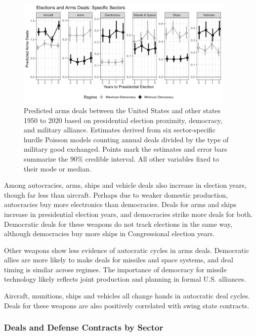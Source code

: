 \documentclass[12pt]{article}
\begin{document}
\begin{figure}[htpb]
	\centering
		\includegraphics[width=0.95\textwidth]{../figures/deals-sector.png}
	\caption{Predicted arms deals between the United States and other states 1950 to 2020 based on presidential election proximity, democracy, and military alliance. Estimates derived from six sector-specific hurdle Poisson models counting annual deals divided by the type of military good exchanged. Points mark the estimates and error bars summarize the 90\% credible interval. All other variables fixed to their mode or median.}
	\label{fig:deals-sector}
\end{figure}


Among autocracies, arms, ships and vehicle deals also increase in election years, though far less than aircraft. 
Perhaps due to weaker domestic production, autocracies buy more electronics than democracies. 
Deals for arms and ships increase in presidential election years, and democracies strike more deals for both.  
Democratic deals for these weapons do not track elections in the same way, although democracies buy more ships in Congressional election years. 


Other weapons show less evidence of autocratic cycles in arms deals. 
Democratic allies are more likely to make deals for missiles and space systems, and deal timing is similar across regimes. 
The importance of democracy for missile technology likely reflects joint production and planning in formal U.S. alliances. 


Aircraft, munitions, ships and vehicles all change hands in autocratic deal cycles. 
Deals for these weapons are also positively correlated with swing state contracts.  



\subsubsection{Deals and Defense Contracts by Sector}
\end{document}
